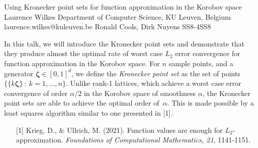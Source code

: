 \begin{talk}
  {Using Kronecker point sets for function approximation in the Korobov space}%
  {Laurence Wilkes}%
  {Department of Computer Science, KU Leuven, Belgium}%
  {laurence.wilkes@kuleuven.be}%
  {Ronald Cools, Dirk Nuyens}%
{}{}{SS8-4}{SS8}



In this talk, we will introduce the Kronecker point sets and demonstrate that they produce almost the optimal rate of worst case $L_2$ error convergence for function approximation in the Korobov space.
For $n$ sample points, and a generator $\boldsymbol{\zeta} \in [0, 1]^d$, we define the \emph{Kronecker point set} as the set of points $\{ \{ k \boldsymbol{\zeta} \} \: : \: k = 1, \ldots, n \}$.
Unlike rank-1 lattices, which achieve a worst case error convergence of order $\alpha/2$ in the Korobov space of smoothness $\alpha$, the Kronecker point sets are able to achieve the optimal order of~$\alpha$.
This is made possible by a least squares algorithm similar to one presented in [1]. %

 \medskip

 \begin{enumerate}%
     \item[{[1]}] Krieg, D., \& Ullrich, M. (2021). Function values are enough for \( L_2 \)-approximation. \textit{Foundations of Computational Mathematics, 21}, 1141-1151.
 \end{enumerate}
\quad
\end{talk}

